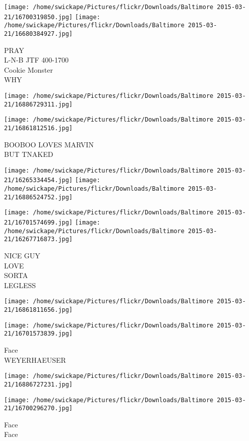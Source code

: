 \documentclass[10pt,letterpaper]{article}
\begin{document}
\texttt{[image: /home/swickape/Pictures/flickr/Downloads/Baltimore 2015-03-21/16700319850.jpg]}
\texttt{[image: /home/swickape/Pictures/flickr/Downloads/Baltimore 2015-03-21/16680384927.jpg]}

PRAY\\
L{-}N{-}B JTF 400{-}1700\\
Cookie Monster\\
WHY
\pagebreak

\texttt{[image: /home/swickape/Pictures/flickr/Downloads/Baltimore 2015-03-21/16886729311.jpg]}

\vspace{0.25in}
\texttt{[image: /home/swickape/Pictures/flickr/Downloads/Baltimore 2015-03-21/16861812516.jpg]}

BOOBOO LOVES MARVIN\\
BUT TNAKED
\pagebreak

\texttt{[image: /home/swickape/Pictures/flickr/Downloads/Baltimore 2015-03-21/16265334454.jpg]}
\texttt{[image: /home/swickape/Pictures/flickr/Downloads/Baltimore 2015-03-21/16886524752.jpg]}

\texttt{[image: /home/swickape/Pictures/flickr/Downloads/Baltimore 2015-03-21/16701574699.jpg]}
\texttt{[image: /home/swickape/Pictures/flickr/Downloads/Baltimore 2015-03-21/16267716873.jpg]}

NICE GUY\\
LOVE\\
SORTA\\
LEGLESS
\pagebreak

\texttt{[image: /home/swickape/Pictures/flickr/Downloads/Baltimore 2015-03-21/16861811656.jpg]}

\vspace{0.25in}
\texttt{[image: /home/swickape/Pictures/flickr/Downloads/Baltimore 2015-03-21/16701573839.jpg]}

Face\\
WEYERHAEUSER
\pagebreak

\texttt{[image: /home/swickape/Pictures/flickr/Downloads/Baltimore 2015-03-21/16886727231.jpg]}

\vspace{0.25in}
\texttt{[image: /home/swickape/Pictures/flickr/Downloads/Baltimore 2015-03-21/16700296270.jpg]}

Face\\
Face
\pagebreak
\end{document}
